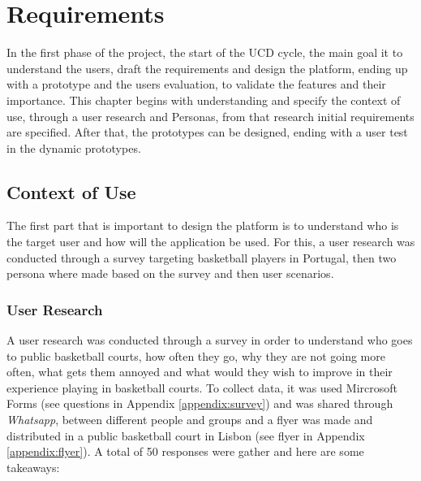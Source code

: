 













\chapter{Requirements}

In the first phase of the project, the start of the UCD cycle, the main goal it to understand the users, draft the requirements and design the platform, ending up with a prototype and the users evaluation, to validate the features and their importance. 
This chapter begins with understanding and specify the context of use, through a user research and Personas, from that research initial requirements are specified. After that, the prototypes can be designed, ending with a user test in the dynamic prototypes. 


\section{Context of Use}

The first part that is important to design the platform is to understand who is the target user and how will the application be used. For this, a user research was conducted through a survey targeting basketball players in Portugal, then two persona where made based on the survey and then user scenarios.

\subsection{User Research}
\label{subsec:rp-survey-design}

A user research was conducted through a survey in order to understand who goes to public basketball courts, how often they go, why they are not going more often, what gets them annoyed and what would they wish to improve in their experience playing in basketball courts. To collect data, it was used Mircrosoft Forms (see questions in Appendix \ref{appendix:survey}) and  was shared through \textit{Whatsapp}, between different people and groups and a flyer was made and distributed in a public basketball court in Lisbon (see flyer in Appendix \ref{appendix:flyer}). A total of 50 responses were gather and here are some takeaways:

